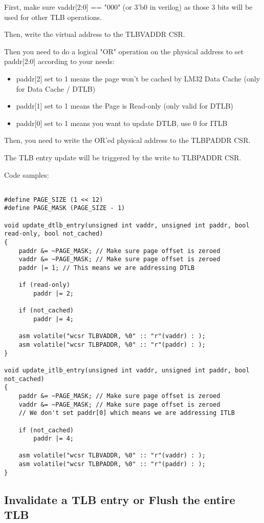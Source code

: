 \documentclass[a4paper,11pt]{article}
\begin{document}
First, make sure vaddr[2:0] == "000" (or 3'b0 in verilog) as those 3 bits will be used for other TLB operations.

Then, write the virtual address to the TLBVADDR CSR.

Then you need to do a logical "OR" operation on the physical address to set paddr[2:0] according to your needs:

\begin{itemize}
	\item paddr[2] set to 1 means the page won't be cached by LM32 Data Cache (only for Data Cache / DTLB)
	\item paddr[1] set to 1 means the Page is Read-only (only valid for DTLB)
	\item paddr[0] set to 1 means you want to update DTLB, use 0 for ITLB
\end{itemize}

Then, you need to write the OR'ed physical address to the TLBPADDR CSR.

The TLB entry update will be triggered by the write to TLBPADDR CSR.

Code samples:

\begin{lstlisting}

#define PAGE_SIZE (1 << 12)
#define PAGE_MASK (PAGE_SIZE - 1)

void update_dtlb_entry(unsigned int vaddr, unsigned int paddr, bool read-only, bool not_cached)
{
	paddr &= ~PAGE_MASK; // Make sure page offset is zeroed
	vaddr &= ~PAGE_MASK; // Make sure page offset is zeroed
	paddr |= 1; // This means we are addressing DTLB

	if (read-only)
		paddr |= 2;

	if (not_cached)
		paddr |= 4;

	asm volatile("wcsr TLBVADDR, %0" :: "r"(vaddr) : );
	asm volatile("wcsr TLBPADDR, %0" :: "r"(paddr) : );
}

void update_itlb_entry(unsigned int vaddr, unsigned int paddr, bool not_cached)
{
	paddr &= ~PAGE_MASK; // Make sure page offset is zeroed
	vaddr &= ~PAGE_MASK; // Make sure page offset is zeroed
	// We don't set paddr[0] which means we are addressing ITLB

	if (not_cached)
		paddr |= 4;

	asm volatile("wcsr TLBVADDR, %0" :: "r"(vaddr) : );
	asm volatile("wcsr TLBPADDR, %0" :: "r"(paddr) : );
}
\end{lstlisting}

\subsection{Invalidate a TLB entry or Flush the entire TLB}
\end{document}
